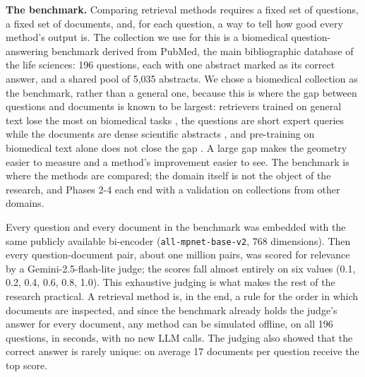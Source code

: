 \documentclass[12pt,a4paper]{article}
\begin{document}
\textbf{The benchmark.} Comparing retrieval methods requires a fixed set of questions, a fixed set of documents, and, for each question, a way to tell how good every method's output is. The collection we use for this is a biomedical question-answering benchmark derived from PubMed, the main bibliographic database of the life sciences: 196 questions, each with one abstract marked as its correct answer, and a shared pool of 5,035 abstracts. We chose a biomedical collection as the benchmark, rather than a general one, because this is where the gap between questions and documents is known to be largest: retrievers trained on general text lose the most on biomedical tasks \citep{thakur2021beir}, the questions are short expert queries while the documents are dense scientific abstracts \citep{tsatsaronis2015bioasq}, and pre-training on biomedical text alone does not close the gap \citep{lee2020biobert,jin2023medcpt}. A large gap makes the geometry easier to measure and a method's improvement easier to see. The benchmark is where the methods are compared; the domain itself is not the object of the research, and Phases 2-4 each end with a validation on collections from other domains.

Every question and every document in the benchmark was embedded with the same publicly available bi-encoder (\texttt{all-mpnet-base-v2}, 768 dimensions). Then every question-document pair, about one million pairs, was scored for relevance by a Gemini-2.5-flash-lite judge; the scores fall almost entirely on six values (0.1, 0.2, 0.4, 0.6, 0.8, 1.0). This exhaustive judging is what makes the rest of the research practical. A retrieval method is, in the end, a rule for the order in which documents are inspected, and since the benchmark already holds the judge's answer for every document, any method can be simulated offline, on all 196 questions, in seconds, with no new LLM calls. The judging also showed that the correct answer is rarely unique: on average 17 documents per question receive the top score.
\end{document}
